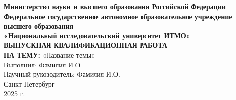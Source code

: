 \begin{titlepage}
    \centering
    \textbf{Министерство науки и высшего образования Российской Федерации}\\
    \textbf{Федеральное государственное автономное образовательное учреждение высшего образования}\\
    \textbf{«Национальный исследовательский университет ИТМО»}\\
    \vfill
    \textbf{ВЫПУСКНАЯ КВАЛИФИКАЦИОННАЯ РАБОТА}\\
    \textbf{НА ТЕМУ:} «Название темы»\\
    \vfill
    Выполнил: Фамилия И.О.\\
    Научный руководитель: Фамилия И.О.\\
    \vfill
    Санкт-Петербург\\
    2025 г.
\end{titlepage}
